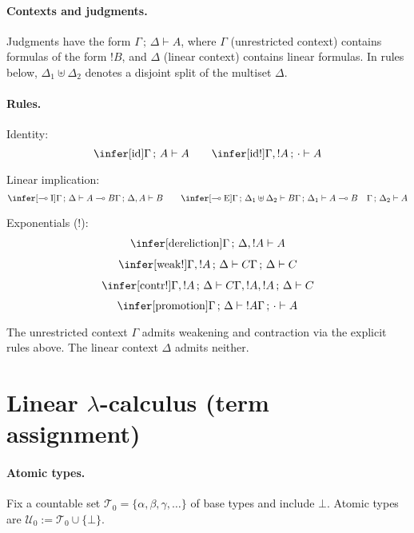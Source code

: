 \paragraph{Contexts and judgments.}
Judgments have the form $\Gamma \,;\, \Delta \vdash A$, where $\Gamma$ (unrestricted context) contains formulas of the form ${!}B$, and $\Delta$ (linear context) contains linear formulas. In rules below, $\Delta_1 \uplus \Delta_2$ denotes a disjoint split of the multiset $\Delta$.

\paragraph{Rules.}
Identity:
\[
\infer[\mathrm{id}]
      {\Gamma \,;\, A \vdash A}{}
\qquad
\infer[\mathrm{id}!]
      {\Gamma,{!}A \,;\, \cdot \vdash A}{}
\]

Linear implication:
\[
\infer[\multimap\mathrm{I}]
      {\Gamma \,;\, \Delta \vdash A \multimap B}
      {\Gamma \,;\, \Delta, A \vdash B}
\qquad
\infer[\multimap\mathrm{E}]
      {\Gamma \,;\, \Delta_1 \uplus \Delta_2 \vdash B}
      {\Gamma \,;\, \Delta_1 \vdash A \multimap B
       \quad
       \Gamma \,;\, \Delta_2 \vdash A}
\]

Exponentials (${!}$):
\[
\begin{gathered}
\infer[\mathrm{dereliction}]
      {\Gamma \,;\, \Delta, {!}A \vdash A}{} \\[4pt]
\infer[\mathrm{weak}!]
      {\Gamma,{!}A \,;\, \Delta \vdash C}
      {\Gamma \,;\, \Delta \vdash C} \\[4pt]
\infer[\mathrm{contr}!]
      {\Gamma,{!}A \,;\, \Delta \vdash C}
      {\Gamma,{!}A,{!}A \,;\, \Delta \vdash C}
\end{gathered}
\]
\[
\infer[\mathrm{promotion}]
      {\Gamma \,;\, \Delta \vdash {!}A}
      {\Gamma \,;\, \cdot \vdash A}
\]

The unrestricted context $\Gamma$ admits weakening and contraction via the explicit rules above. The linear context $\Delta$ admits neither.

\section{Linear \texorpdfstring{$\lambda$}{lambda}-calculus (term assignment)}
\label{sec:lin-lambda}

\paragraph{Atomic types.}
Fix a countable set $\mathcal{T}_0=\{\alpha,\beta,\gamma,\dots\}$ of base types and include $\bot$. Atomic types are $\mathcal{U}_0:=\mathcal{T}_0 \cup \{\bot\}$.

